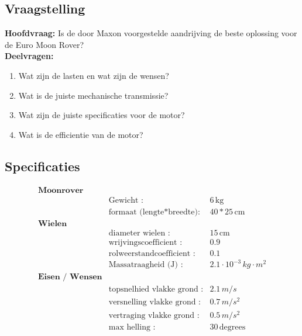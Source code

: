 \subsection{Vraagstelling}
\textbf{Hoofdvraag:}
Is de door Maxon voorgestelde aandrijving de beste oplossing voor de Euro Moon Rover?\\
\textbf{Deelvragen:}
\begin{enumerate}
    \item Wat zijn de lasten en wat zijn de wensen?
    \item Wat is de juiste mechanische transmissie?
    \item Wat zijn de juiste specificaties voor de motor?
    \item Wat is de efficientie van de motor?
\end{enumerate}

\subsection{Specificaties}
\begin{align*}
  \textbf{Moonrover}\\
  &\text{Gewicht :} & 6 \, \text{kg} \\
  &\text{formaat (lengte*breedte):} & 40*25 \, \text{cm}\\
  \textbf{Wielen}\\
  &\text{diameter wielen :} & 15 \, \text{cm}\\
  &\text{wrijvingscoefficient :} & 0.9 \, \\
  &\text{rolweerstandcoefficient :} & 0.1 \, \\
  &\text{Massatraagheid (J) :} & \text{$2.1 \cdot 10^{-3}$} \, \text{$kg \cdot m^{2}$}\\
  \textbf{Eisen / Wensen}\\
  &\text{topsnelhied vlakke grond :} & 2.1 \, \text{$m/s$}\\
  &\text{versnelling vlakke grond :} & 0.7 \, \text{$m/s^{2}$}\\
  &\text{vertraging vlakke grond :} & 0.5 \, \text{$m/s^{2}$}\\
  &\text{max helling :} & 30 \, \text{degrees}
\end{align*}
\cite{canvas}